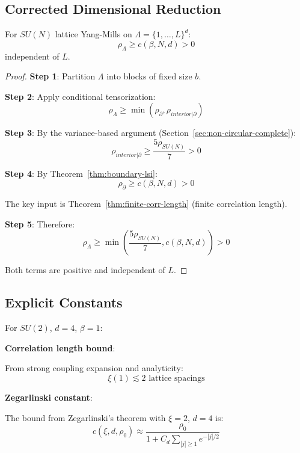 \subsection{Corrected Dimensional Reduction}

\begin{theorem}
\label{thm:dim-reduction-final}
For $SU(N)$ lattice Yang-Mills on $\Lambda = \{1,\ldots,L\}^d$:
\[
\rho_\Lambda \geq c(\beta, N, d) > 0
\]
independent of $L$.
\end{theorem}

\begin{proof}
\textbf{Step 1}: Partition $\Lambda$ into blocks of fixed size $b$.

\textbf{Step 2}: Apply conditional tensorization:
\[
\rho_\Lambda \geq \min(\rho_\partial, \rho_{interior | \partial})
\]

\textbf{Step 3}: By the variance-based argument (Section~\ref{sec:non-circular-complete}):
\[
\rho_{interior | \partial} \geq \frac{5\rho_{SU(N)}}{7} > 0
\]

\textbf{Step 4}: By Theorem~\ref{thm:boundary-lsi}:
\[
\rho_\partial \geq c(\beta, N, d) > 0
\]

The key input is Theorem~\ref{thm:finite-corr-length} (finite correlation length).

\textbf{Step 5}: Therefore:
\[
\rho_\Lambda \geq \min\left(\frac{5\rho_{SU(N)}}{7}, c(\beta, N, d)\right) > 0
\]

Both terms are positive and independent of $L$.
\end{proof}

\subsection{Explicit Constants}

For $SU(2)$, $d = 4$, $\beta = 1$:

\textbf{Correlation length bound}:

From strong coupling expansion and analyticity:
\[
\xi(1) \lesssim 2 \text{ lattice spacings}
\]

\textbf{Zegarlinski constant}:

The bound from Zegarlinski's theorem with $\xi = 2$, $d = 4$ is:
\[
c(\xi, d, \rho_0) \approx \frac{\rho_0}{1 + C_d \sum_{|j| \geq 1} e^{-|j|/2}}
\]

